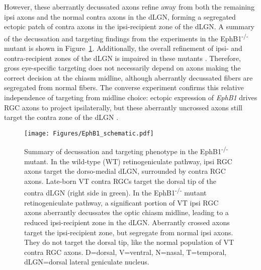 However, these aberrantly decussated axons refine away from both the remaining ipsi axons and the normal contra axons in the dLGN, forming a segregated ectopic patch of contra axons in the ipsi-recipient zone of the dLGN.
A summary of the decussation and targeting findings from the experiments in the EphB1\textsuperscript{-/-} mutant is shown in Figure~\ref{EphB1schematic}.
Additionally, the overall refinement of ipsi- and contra-recipient zones of the dLGN is impaired in these mutants \cite{rebsam2009switching}.
Therefore, gross eye-specific targeting does not necessarily depend on axons making the correct decision at the chiasm midline, although aberrantly decussated fibers are segregated from normal fibers.
The converse experiment confirms this relative independence of targeting from midline choice: ectopic expression of \emph{EphB1} drives RGC axons to project ipsilaterally, but these aberrantly uncrossed axons still target the contra zone of the dLGN \cite{rebsam2009switching}.
\begin{figure}[hbtp]
    \begin{center}
        \texttt{[image: Figures/EphB1\_schematic.pdf]}
        \caption[Summary of decussation and targeting phenotype in the EphB1\textsuperscript{-/-} mutant.]
        {Summary of decussation and targeting phenotype in the EphB1\textsuperscript{-/-} mutant.
		In the wild-type (WT) retinogeniculate pathway, ipsi RGC axons target the dorso-medial dLGN, surrounded by contra RGC axons.
		Late-born VT contra RGCs target the dorsal tip of the contra dLGN (right side in green).
		In the EphB1\textsuperscript{-/-} mutant retinogeniculate pathway, a significant portion of VT ipsi RGC axons aberrantly decussates the optic chiasm midline, leading to a reduced ipsi-recipient zone in the dLGN.
		Aberrantly crossed axons target the ipsi-recipient zone, but segregate from normal ipsi axons.
		They do not target the dorsal tip, like the normal population of VT contra RGC axons.
		D=dorsal, V=ventral, N=nasal, T=temporal, dLGN=dorsal lateral geniculate nucleus.}
        \label{EphB1schematic}
    \end{center}
\end{figure}